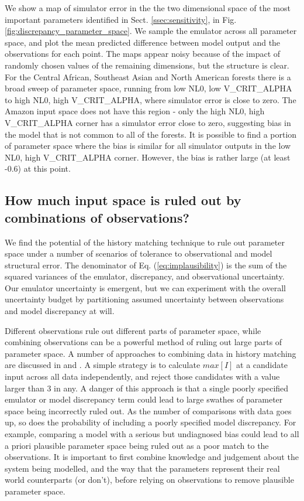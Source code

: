 \documentclass[esd, article]{copernicus} %
\begin{document}
We show a map of simulator error in the the two dimensional space of the most important parameters identified in Sect. \ref{ssec:sensitivity}, in Fig.  \ref{fig:discrepancy_parameter_space}. We sample the emulator across all parameter space, and plot the mean predicted difference between model output and the observations for each point. The maps appear noisy because of the impact of randomly chosen values of the remaining dimensions, but the structure is clear. For the Central African, Southeast Asian and North American forests there is a broad sweep of parameter space, running from low NL0, low V\_CRIT\_ALPHA to high NL0, high V\_CRIT\_ALPHA, where simulator error is close to zero. The Amazon input space does not have this region - only the high NL0, high V\_CRIT\_ALPHA corner has a simulator error close to zero, suggesting bias in the model that is not common to all of the forests. It is possible to find a portion of parameter space where the bias is similar for all simulator outputs in the low NL0, high V\_CRIT\_ALPHA corner. However, the bias is rather large (at least -0.6) at this point.


\subsection{How much input space is ruled out by combinations of observations?}\label{ssec:combination}
We find the potential of the history matching technique to rule out parameter space under a number of scenarios of tolerance to observational and model structural error. The denominator of Eq. (\ref{eq:implausibility}) is the sum of the squared variances of the emulator, discrepancy, and observational uncertainty. Our emulator uncertainty is emergent, but we can experiment with the overall uncertainty budget by partitioning assumed uncertainty between observations and model discrepancy at will.

Different observations rule out different parts of parameter space, while combining observations can be a powerful method of ruling out large parts of parameter space. A number of approaches to combining data in history matching are discussed in \cite{vernon2010galaxy} and \cite{williamson2013history}. A simple strategy is to calculate $max[I]$ at a candidate input across all data independently, and reject those candidates with a value larger than 3 in any. A danger of this approach is that a single poorly specified emulator or model discrepancy term could lead to large swathes of parameter space being incorrectly ruled out. As the number of comparisons with data goes up, so does the probability of including a poorly specified model discrepancy. For example, comparing a model with a serious but undiagnosed bias could lead to all a priori plausible parameter space being ruled out as a poor match to the observations. It is important to first combine knowledge and judgement about the system being modelled, and the way that the parameters represent their real world counterparts (or don't), before relying on observations to remove plausible parameter space.
\end{document}
